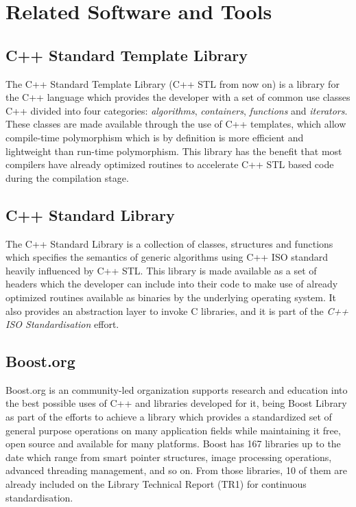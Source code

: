 \section{Related Software and Tools}

\subsection{C++ Standard Template Library}
The C++ Standard Template Library (C++ STL from now on) is a library for the C++ language which provides the developer with a set of common use classes C++ divided into four categories: \textit{algorithms}, \textit{containers}, \textit{functions} and \textit{iterators}. These classes are made available through the use of C++ templates, which allow compile-time polymorphism which is by definition is more efficient and lightweight than run-time polymorphism. This library has the benefit that most compilers have already optimized routines to accelerate C++ STL based code during the compilation stage.

\subsection{C++ Standard Library}
The C++ Standard Library is a collection of classes, structures and functions which specifies the semantics of generic algorithms using C++ ISO standard heavily influenced by C++ STL. This library is made available as a set of headers which the developer can include into their code to make use of already optimized routines available as binaries by the underlying operating system. It also provides an abstraction layer to invoke C libraries, and it is part of the \textit{C++ ISO Standardisation} effort.

\subsection{Boost.org}
Boost.org is an community-led organization supports research and education into the best possible uses of C++ and libraries developed for it, being Boost Library as part of the efforts to achieve a library which provides a standardized set of general purpose operations on many application fields while maintaining it free, open source and available for many platforms. Boost has 167 libraries up to the date which range from smart pointer structures, image processing operations, advanced threading management, and so on. From those libraries, 10 of them are already included on the Library Technical Report (TR1) for continuous standardisation.


